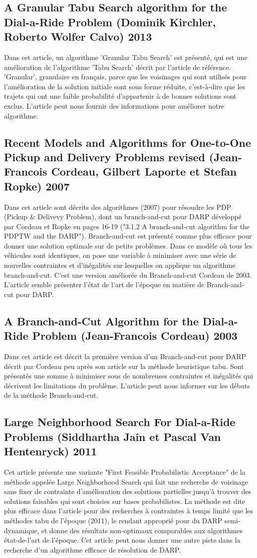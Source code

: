\documentclass[10pt,a4paper]{report}
\begin{document}
\subsection*{A Granular Tabu Search algorithm for the Dial-a-Ride Problem (Dominik Kirchler, Roberto Wolfer Calvo) 2013}
Dans cet article, un algorithme 'Granular Tabu Search' est présenté, qui est une amélioration de l'algorithme 'Tabu Search' décrit par l'article de référence. 'Granular', granulaire en français, parce que les voisinages qui sont utilisés pour l'amélioration de la solution initiale sont sous forme réduite, c'est-à-dire que les trajets qui ont une faible probabilité d'appartenir à de bonnes solutions sont exclus. L'article peut nous fournir des informations pour améliorer notre algorithme.
\subsection*{Recent Models and Algorithms for One-to-One
Pickup and Delivery Problems revised (Jean-Francois Cordeau, Gilbert Laporte et Stefan Ropke) 2007}
Dans cet article sont décrits des algorithmes (2007) pour résoudre les PDP (Pickup \& Delivevy Problem), dont un branch-and-cut pour DARP développé par Cordeau et Ropke en pages 16-19 ("3.1.2 A branch-and-cut algorithm for the PDPTW and the DARP").
Branch-and-cut est présenté comme plus efficace pour donner une solution optimale sur de petits problèmes.
Dans ce modèle où tous les véhicules sont identiques, on pose une variable à minimiser avec une série de nouvelles contraintes et d'inégalités sur lesquelles on applique un algorithme branch-and-cut. C'est une version améliorée du Branch-and-cut Cordeau de 2003.
L'article semble présenter l'état de l'art de l'époque en matière de Branch-and-cut pour DARP.
\subsection*{A Branch-and-Cut Algorithm for the Dial-a-Ride Problem (Jean-Francois Cordeau) 2003}
Dans cet article est décrit la première version d'un Branch-and-cut pour DARP décrit par Cordeau peu après son article sur la méthode heuristique tabu. Sont présentés une somme à minimiser sous de nombreuses contraintes et inégalités qui décrivent les limitations du problème.
L'article peut nous informer sur les débuts de la méthode Branch-and-cut.
\subsection*{Large Neighborhood Search For Dial-a-Ride Problems (Siddhartha Jain et Pascal Van Hentenryck) 2011}
Cet article présente une variante "First Feasible Probabilistic Acceptance" de la méthode appelée Large Neighborhood Search qui fait une recherche de voisinage sans fixer de contrainte d'amélioration des solutions partielles jusqu'à trouver des solutions faisables qui sont choisies sur bases probabilistes. La méthode est dite plus efficace dans l'article pour des recherches à contraintes à temps limité que les méthodes tabu de l'époque (2011), le rendant approprié pour du DARP semi-dynamique, et donne des résultats non-optimaux comparables aux algorithmes état-de-l'art de l'époque.
Cet article peut nous donner une autre piste dans la recherche d'un algorithme efficace de résolution de DARP.
\end{document}
